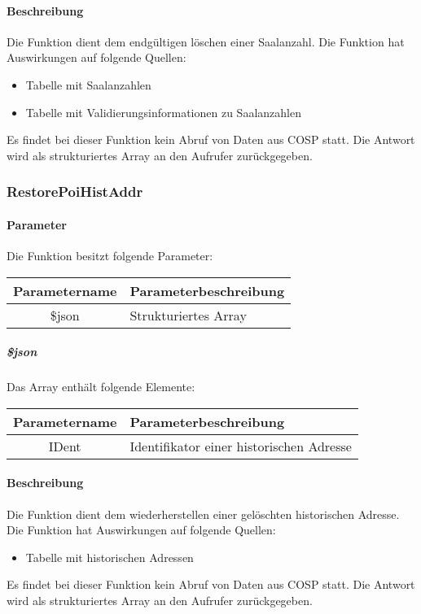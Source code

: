 \paragraph{Beschreibung} Die Funktion dient dem endgültigen löschen einer Saalanzahl. Die Funktion hat Auswirkungen auf folgende Quellen:
\begin{itemize}
	\item Tabelle mit Saalanzahlen
	\item Tabelle mit Validierungsinformationen zu Saalanzahlen
\end{itemize}
Es findet bei dieser Funktion kein Abruf von Daten aus {\glqq COSP\grqq} statt. Die Antwort wird als strukturiertes Array an den Aufrufer zurückgegeben.
\subsubsection{RestorePoiHistAddr}
\paragraph{Parameter} Die Funktion besitzt folgende Parameter:
\begin{table}[H]
	\begin{tabular}{|c|p{11cm}|}
		\hline
		\textbf{Parametername} & \textbf{Parameterbeschreibung} \\ \hline
		\$json & Strukturiertes Array \\ \hline
	\end{tabular}
\end{table}
\subparagraph{\$json}Das Array enthält folgende Elemente:
\begin{table}[H]
	\begin{tabular}{|c|p{11cm}|}
		\hline
		\textbf{Parametername} & \textbf{Parameterbeschreibung} \\ \hline
		IDent & Identifikator einer historischen Adresse \\ \hline
	\end{tabular}
\end{table}
\paragraph{Beschreibung} Die Funktion dient dem wiederherstellen einer gelöschten historischen Adresse. Die Funktion hat Auswirkungen auf folgende Quellen:
\begin{itemize}
	\item Tabelle mit historischen Adressen
\end{itemize}
Es findet bei dieser Funktion kein Abruf von Daten aus {\glqq COSP\grqq} statt. Die Antwort wird als strukturiertes Array an den Aufrufer zurückgegeben.
